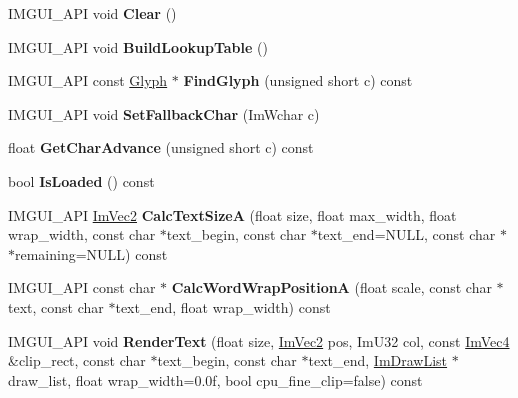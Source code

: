 \begin{DoxyCompactItemize}
\item 
\mbox{\label{struct_im_font_a46a541529464d023b38cdc3df231e314}} 
I\+M\+G\+U\+I\+\_\+\+A\+PI void {\bfseries Clear} ()
\item 
\mbox{\label{struct_im_font_a739a4ff457badbd8ac392745b79cfda5}} 
I\+M\+G\+U\+I\+\_\+\+A\+PI void {\bfseries Build\+Lookup\+Table} ()
\item 
\mbox{\label{struct_im_font_af126b40cf2fffe7c4392d0ca4b26533e}} 
I\+M\+G\+U\+I\+\_\+\+A\+PI const \mbox{\hyperlink{struct_im_font_1_1_glyph}{Glyph}} $\ast$ {\bfseries Find\+Glyph} (unsigned short c) const
\item 
\mbox{\label{struct_im_font_a3733e80209e6ea3289f2528392187c2e}} 
I\+M\+G\+U\+I\+\_\+\+A\+PI void {\bfseries Set\+Fallback\+Char} (Im\+Wchar c)
\item 
\mbox{\label{struct_im_font_af7e0a40a425df9234b74c6066af653d6}} 
float {\bfseries Get\+Char\+Advance} (unsigned short c) const
\item 
\mbox{\label{struct_im_font_a97dafa61cc94e84be396d69b0d42b1ce}} 
bool {\bfseries Is\+Loaded} () const
\item 
\mbox{\label{struct_im_font_a3d055742e5632ff0a96dbd7a46726d42}} 
I\+M\+G\+U\+I\+\_\+\+A\+PI \mbox{\hyperlink{struct_im_vec2}{Im\+Vec2}} {\bfseries Calc\+Text\+SizeA} (float size, float max\+\_\+width, float wrap\+\_\+width, const char $\ast$text\+\_\+begin, const char $\ast$text\+\_\+end=N\+U\+LL, const char $\ast$$\ast$remaining=N\+U\+LL) const
\item 
\mbox{\label{struct_im_font_a10a4d3d09ef7e3773bc8a6a77e8d2a55}} 
I\+M\+G\+U\+I\+\_\+\+A\+PI const char $\ast$ {\bfseries Calc\+Word\+Wrap\+PositionA} (float scale, const char $\ast$text, const char $\ast$text\+\_\+end, float wrap\+\_\+width) const
\item 
\mbox{\label{struct_im_font_ac56ca9bc5f1c1bafcdd900095bdd0b4a}} 
I\+M\+G\+U\+I\+\_\+\+A\+PI void {\bfseries Render\+Text} (float size, \mbox{\hyperlink{struct_im_vec2}{Im\+Vec2}} pos, Im\+U32 col, const \mbox{\hyperlink{struct_im_vec4}{Im\+Vec4}} \&clip\+\_\+rect, const char $\ast$text\+\_\+begin, const char $\ast$text\+\_\+end, \mbox{\hyperlink{struct_im_draw_list}{Im\+Draw\+List}} $\ast$draw\+\_\+list, float wrap\+\_\+width=0.\+0f, bool cpu\+\_\+fine\+\_\+clip=false) const
\end{DoxyCompactItemize}
